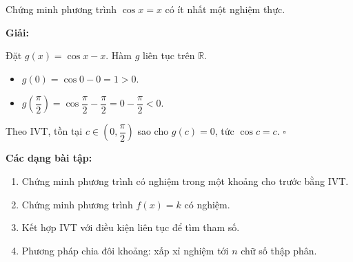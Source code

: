 \documentclass[12pt,a4paper]{article}
\begin{document}
\begin{vidu}
  Chứng minh phương trình $\cos x = x$ có ít nhất một nghiệm thực.

  \medskip\textbf{Giải:}

  Đặt $g(x) = \cos x - x$. Hàm $g$ liên tục trên $\mathbb{R}$.
  \begin{itemize}
    \item $g(0) = \cos 0 - 0 = 1 > 0$.
    \item $g\!\left(\dfrac{\pi}{2}\right) = \cos\dfrac{\pi}{2} - \dfrac{\pi}{2} = 0 - \dfrac{\pi}{2} < 0$.
  \end{itemize}
  Theo IVT, tồn tại $c \in \left(0, \dfrac{\pi}{2}\right)$ sao cho $g(c) = 0$, tức $\cos c = c$. $\square$
\end{vidu}

\medskip\noindent\textbf{Các dạng bài tập:}
\begin{enumerate}[label=\textbf{Dạng \arabic*:}, leftmargin=*, align=left]
  \item Chứng minh phương trình có nghiệm trong một khoảng cho trước bằng IVT.
  \item Chứng minh phương trình $f(x) = k$ có nghiệm.
  \item Kết hợp IVT với điều kiện liên tục để tìm tham số.
  \item Phương pháp chia đôi khoảng: xấp xỉ nghiệm tới $n$ chữ số thập phân.
\end{enumerate}
\end{document}
